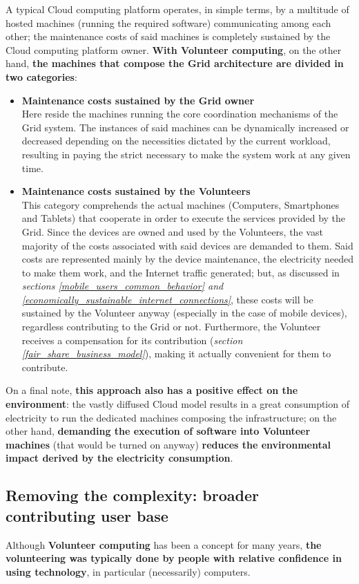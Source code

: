 A typical Cloud computing platform operates, in simple terms, by a multitude of hosted machines (running the required software) communicating among each other; the maintenance costs of said machines is completely sustained by the Cloud computing platform owner. \textbf{With Volunteer computing}, on the other hand, \textbf{the machines that compose the Grid architecture are divided in two categories}:
\begin{itemize}
    \item \textbf{Maintenance costs sustained by the Grid owner}\\
    Here reside the machines running the core coordination mechanisms of the Grid system. The instances of said machines can be dynamically increased or decreased depending on the necessities dictated by the current workload, resulting in paying the strict necessary to make the system work at any given time.
    \item \textbf{Maintenance costs sustained by the Volunteers}\\
    This category comprehends the actual machines (Computers, Smartphones and Tablets) that cooperate in order to execute the services provided by the Grid. Since the devices are owned and used by the Volunteers, the vast majority of the costs associated with said devices are demanded to them. Said costs are represented mainly by the device maintenance, the electricity needed to make them work, and the Internet traffic generated; but, as discussed in \textit{sections \ref{mobile_users_common_behavior} and \ref{economically_sustainable_internet_connections}}, these costs will be sustained by the Volunteer anyway (especially in the case of mobile devices), regardless contributing to the Grid or not. Furthermore, the Volunteer receives a compensation for its contribution (\textit{section \ref{fair_share_business_model}}), making it actually convenient for them to contribute.
\end{itemize}

On a final note, \textbf{this approach also has a positive effect on the environment}: the vastly diffused Cloud model results in a great consumption of electricity to run the dedicated machines composing the infrastructure; on the other hand, \textbf{demanding the execution of software into Volunteer machines} (that would be turned on anyway) \textbf{reduces the environmental impact derived by the electricity consumption}.

\subsection{Removing the complexity: broader contributing user base}
Although \textbf{Volunteer computing} has been a concept for many years, \textbf{the volunteering was typically done by people with relative confidence in using technology}, in particular (necessarily) computers.

